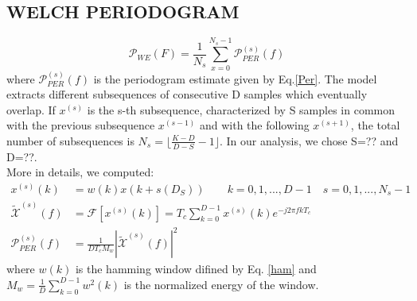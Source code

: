\documentclass[a4paper,11pt,openright,twoside]{report}
\begin{document}
\subsection*{WELCH PERIODOGRAM}
\begin{equation}
\mathcal{P}_{WE}(F) = \frac{1}{N_s}\sum_{x=0}^{N_s-1}\mathcal{P}_{PER}^{(s)}(f)
\end{equation}
where $\mathcal{P}_{PER}^{(s)}(f)$ is the periodogram estimate given by Eq.\ref{Per}.  
The model extracts different subsequences of consecutive D samples which eventually overlap. If $x^{(s)}$ is the s-th subsequence, characterized by S samples in common with the previous subsequence $x^{(s-1)}$ and with the following $x^{(s+1)}$, the total number of subsequences is $N_s = \lfloor \frac{K-D}{D-S}-1 \rfloor$. In our analysis, we chose S=?? and D=??. \\
More in details, we computed:
\begin{equation*}
\begin{split}
x^{(s)}(k) &= w(k)x(k+s(D_S))   \quad \quad k=0,1,...,D-1 \quad s = 0,1,...,N_s-1 \\
\tilde{\mathcal{X}}^{(s)}(f) &= \mathcal{F}[x^{(s)}(k)] = T_c\sum_{k=0}^{D-1}x^{(s)}(k)e^{-j2 \pi fkT_c} \\
\mathcal{P}^{(s)}_{PER}(f) &= \frac{1}{DT_cM_w} \left | \tilde{\mathcal{X}}^{(s)}(f) \right |^2
\end{split}
\end{equation*}
where $w(k)$ is the hamming window difined by Eq. \ref{ham} and $M_w = \frac{1}{D}\sum_{k=0}^{D-1}w^2(k)$ is the normalized energy of the window.
\end{document}
